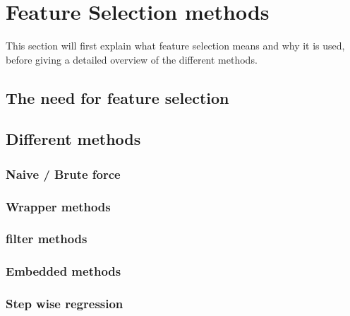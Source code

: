 \chapter{Feature Selection methods}
{\samenvatting This section will first explain what feature selection means and why it is used, before giving a detailed overview of the different methods.}


\section{The need for feature selection}

\section{Different methods}

\subsection{Naive / Brute force}

\subsection{Wrapper methods}

\subsection{filter methods}

\subsection{Embedded methods}

\subsection{Step wise regression}
